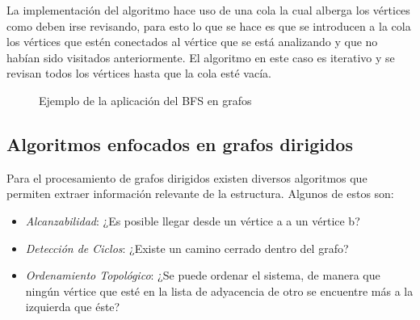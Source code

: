 \documentclass[a4paper, 11pt]{report}
\newcommand{\DrawGraph}[5]{

    \begin{scope}[#4]
    \foreach \pos/\nodo in {{(0,0)/1}, {(2,1)/2}, {(4,1)/3}, {(0,2)/4}, {(3,0)/5}, {(2,-1)/6}, {(4,-1)/7}}
        \node[vertex] (#3\nodo) at \pos {\nodo};

    \foreach \start/\end in {1/4, 1/2, 1/6,2/5,2/3,2/6,5/7,3/7,4/2,6/7}
        \path[edge,#5] (#3\start) -- (#3\end);

    \foreach \nodo in {#1}
        \node[selected vertex] at (#3\nodo) {\nodo};
        

    \begin{pgfonlayer}{background}
        \foreach \start/\end in {#2}
            \path[selected edge,#5] (#3\start) -- (#3\end);
    \end{pgfonlayer}
    \end{scope}
}
\newcommand{\DrawArrow}[1]{
    \begin{scope}[scale=0.5,#1]
        \filldraw[arrow] (0,0) -- (2,0) -- +(270:0.5) -- (3,0.5) -- (2,1.5) -- +(270:0.5) -- (0,1) -- cycle;
    \end{scope}
}
\newcommand{\Deactivate}{\shorthandoff{<>."}}
\newcommand{\Activate}{\shorthandon{<>."}}
\begin{document}
La implementaci\'on del algoritmo hace uso de una cola la cual alberga los v\'ertices como deben irse revisando, para esto lo que se hace es que se introducen a la cola los v\'ertices que est\'en conectados al v\'ertice que se est\'a analizando y que no hab\'ian sido visitados anteriormente. El algoritmo en este caso es iterativo y se revisan todos los v\'ertices hasta que la cola est\'e vac\'ia.

\begin{figure}[!h]
    \centering
    \caption{Ejemplo de la aplicaci\'on del BFS en grafos}
    \label{BFSFigure}
\end{figure}

\subsection{Algoritmos enfocados en grafos dirigidos}
Para el procesamiento de grafos dirigidos existen diversos algoritmos que permiten extraer informaci\'on relevante de la estructura. Algunos de estos son:

\begin{itemize}
    \item \textit{Alcanzabilidad}: ¿Es posible llegar desde un v\'ertice a a un v\'ertice b?
    \item \textit{Detecci\'on de Ciclos}: ¿Existe un camino cerrado dentro del grafo?
    \item \textit{Ordenamiento Topol\'ogico}: ¿Se puede ordenar el sistema, de manera que ning\'un v\'ertice que est\'e en la lista de adyacencia de otro se encuentre m\'as a la izquierda que \'este?
\end{itemize}
\end{document}
